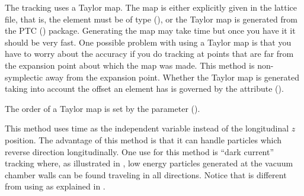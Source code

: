 \begin{description}
\item[\vn{Taylor}]
The tracking uses a Taylor map. The map is either explicitly given in the lattice file, that is, the
element must be of type  (), or the Taylor map is generated from the PTC
() package. Generating the map may take time but once you have it it should be
very fast. One possible problem with using a Taylor map is that you have to worry about the accuracy
if you do tracking at points that are far from the expansion point about which the map was
made. This method is non-symplectic away from the expansion point. Whether the Taylor map is
generated taking into account the offset an element has is governed by the
 attribute ().

The order of a Taylor map is set by the 
parameter ().

\item[\vn{Time_Runge_Kutta}]
This method uses time as the independent variable instead of the longitudinal $z$ position. The
advantage of this method is that it can handle particles which reverse direction longitudinally.
One use for this method is ``dark current'' tracking where, as illustrated in ,
low energy particles generated at the vacuum chamber walls can be found traveling in all
directions. Notice that  is different from using  as
explained in .

\end{description}


